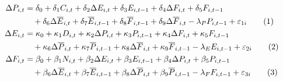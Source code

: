 \documentclass[a4paper,11pt,oneside]{article}
\begin{document}


\begin{align}
\Delta P_{i,t} &= \delta_0 + \delta_1 C_{i,t} + \delta_2 \Delta E_{i,t} + \delta_3 E_{i,t-1} + \delta_4 \Delta F_{i,t} + \delta_5 F_{i,t-1} \notag \\
&\quad + \delta_6 \Delta \overline{E}_{i,t} + \delta_7 \overline{E}_{i,t-1} + \delta_8 \overline{F}_{i,t-1} + \delta_9 \Delta \overline{F}_{i,t} - \lambda_P P_{i,t-1} + \varepsilon_{1i} \tag{1}\label{eq:pop_compact} \\
\Delta E_{i,t} &= \kappa_0 + \kappa_1 D_{i,t} + \kappa_2 \Delta P_{i,t} + \kappa_3 P_{i,t-1} + \kappa_4 \Delta F_{i,t} + \kappa_5 F_{i,t-1} \notag \\
&\quad + \kappa_6 \Delta \overline{P}_{i,t} + \kappa_7 \overline{P}_{i,t-1} + \kappa_8 \Delta \overline{F}_{i,t} + \kappa_9 \overline{F}_{i,t-1} - \lambda_E E_{i,t-1} + \varepsilon_{2i} \tag{2}\label{eq:emp_compact} \\
\Delta F_{i,t} &= \beta_0 + \beta_1 N_{i,t} + \beta_2 \Delta E_{i,t} + \beta_3 E_{i,t-1} + \beta_4 \Delta P_{i,t} + \beta_5 P_{i,t-1} \notag \\
&\quad + \beta_6 \Delta \overline{E}_{i,t} + \beta_7 \overline{E}_{i,t-1} + \beta_8 \Delta \overline{P}_{i,t} + \beta_9 \overline{P}_{i,t-1} - \lambda_F F_{i,t-1} + \varepsilon_{3i} \tag{3}\label{eq:fin_compact}
\end{align}
\end{document}
